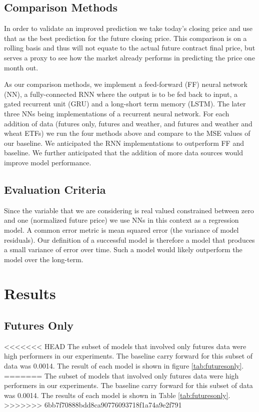 \documentclass[twoside,11pt]{article}
\begin{document}
\subsection{Comparison Methods}

In order to validate an improved prediction we take today's closing price and use that as the best prediction for the future closing price. This comparison is on a rolling basis and thus will not equate to the actual future contract final price, but serves a proxy to see how the market already performs  in predicting the price one month out. 

As our comparison methods, we implement a feed-forward (FF) neural network (NN), a fully-connected RNN where the output is to be fed back to input, a gated recurrent unit (GRU) and a long-short term memory (LSTM). The later three NNs being implementations of a recurrent neural network. For each addition of data (futures only, futures and weather, and futures and weather and wheat ETFs) we run the four methods above and compare to the MSE values of our baseline. We anticipated the RNN implementations to outperform FF and baseline. We further anticipated that the addition of more data sources would improve model performance. 

\subsection{Evaluation Criteria}

Since the variable that we are considering is real valued constrained between zero and one (normalized future price) we use NNs in this context as a regression model. A common error metric is mean squared error (the variance of model residuals). Our definition of a successful model is therefore a model that produces a small variance of error over time. Such a model would likely outperform the model over the long-term. 

\section{Results} \label{results}

\subsection{Futures Only}

<<<<<<< HEAD
The subset of models that involved only futures data were high performers in our experiments. The baseline carry forward for this subset of data was 0.0014. The result of each model is shown in figure \ref{tab:futuresonly}.
=======
The subset of models that involved only futures data were high performers in our experiments. The baseline carry forward for this subset of data was 0.0014. The results of each model is shown in Table \ref{tab:futuresonly}.
>>>>>>> 6bb7f70888bdd8ca90776093718f1a74a9e2f791
\end{document}
